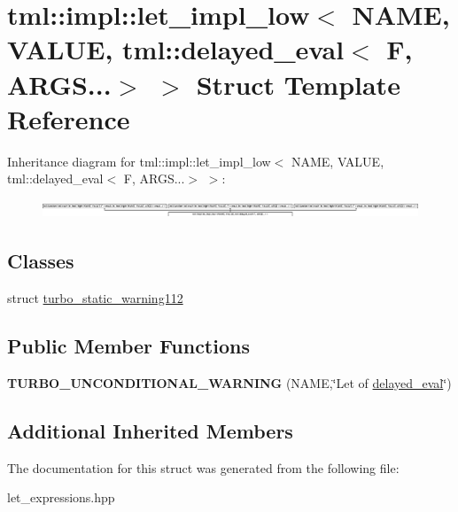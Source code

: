 \hypertarget{structtml_1_1impl_1_1let__impl__low_3_01NAME_00_01VALUE_00_01tml_1_1delayed__eval_3_01F_00_01ARGS_8_8_8_4_01_4}{\section{tml\+:\+:impl\+:\+:let\+\_\+impl\+\_\+low$<$ N\+A\+M\+E, V\+A\+L\+U\+E, tml\+:\+:delayed\+\_\+eval$<$ F, A\+R\+G\+S...$>$ $>$ Struct Template Reference}
\label{structtml_1_1impl_1_1let__impl__low_3_01NAME_00_01VALUE_00_01tml_1_1delayed__eval_3_01F_00_01ARGS_8_8_8_4_01_4}
}
Inheritance diagram for tml\+:\+:impl\+:\+:let\+\_\+impl\+\_\+low$<$ N\+A\+M\+E, V\+A\+L\+U\+E, tml\+:\+:delayed\+\_\+eval$<$ F, A\+R\+G\+S...$>$ $>$\+:\begin{figure}[H]
\begin{center}
\leavevmode
\includegraphics[height=0.535629cm]{structtml_1_1impl_1_1let__impl__low_3_01NAME_00_01VALUE_00_01tml_1_1delayed__eval_3_01F_00_01ARGS_8_8_8_4_01_4}
\end{center}
\end{figure}
\subsection*{Classes}
\begin{DoxyCompactItemize}
\item 
struct \hyperlink{structtml_1_1impl_1_1let__impl__low_3_01NAME_00_01VALUE_00_01tml_1_1delayed__eval_3_01F_00_01ARGfa1b3cb6d23c24dca45f4e96234fdcd1}{turbo\+\_\+static\+\_\+warning112}
\end{DoxyCompactItemize}
\subsection*{Public Member Functions}
\begin{DoxyCompactItemize}
\item 
\hypertarget{structtml_1_1impl_1_1let__impl__low_3_01NAME_00_01VALUE_00_01tml_1_1delayed__eval_3_01F_00_01ARGS_8_8_8_4_01_4_a36172a73722b1f8617702f36977a4d4c}{{\bfseries T\+U\+R\+B\+O\+\_\+\+U\+N\+C\+O\+N\+D\+I\+T\+I\+O\+N\+A\+L\+\_\+\+W\+A\+R\+N\+I\+N\+G} (N\+A\+M\+E,\char`\"{}Let of \hyperlink{structtml_1_1delayed__eval}{delayed\+\_\+eval}\char`\"{})}\label{structtml_1_1impl_1_1let__impl__low_3_01NAME_00_01VALUE_00_01tml_1_1delayed__eval_3_01F_00_01ARGS_8_8_8_4_01_4_a36172a73722b1f8617702f36977a4d4c}

\end{DoxyCompactItemize}
\subsection*{Additional Inherited Members}


The documentation for this struct was generated from the following file\+:\begin{DoxyCompactItemize}
\item 
let\+\_\+expressions.\+hpp\end{DoxyCompactItemize}
